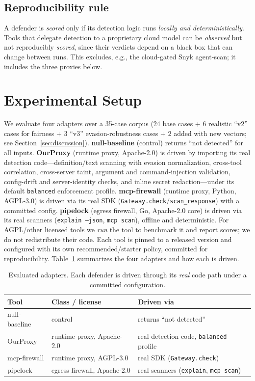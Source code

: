\documentclass[sigconf,review,anonymous]{acmart}
\begin{document}
\subsection{Reproducibility rule}\label{sec:repro}
A defender is \emph{scored} only if its detection logic runs \emph{locally and deterministically}. Tools that delegate detection to a proprietary cloud model can be \emph{observed} but not reproducibly \emph{scored}, since their verdicts depend on a black box that can change between runs. This excludes, e.g., the cloud-gated Snyk agent-scan; it includes the three proxies below.

\section{Experimental Setup}\label{sec:setup}
We evaluate four adapters over a 35-case corpus (24 base cases + 6 realistic ``v2'' cases for fairness + 3 ``v3'' evasion-robustness cases + 2 added with new vectors; see Section~\ref{sec:discussion}). \textbf{null-baseline} (control) returns ``not detected'' for all inputs. \textbf{OurProxy} (runtime proxy, Apache-2.0) is driven by importing its real detection code---definition/text scanning with evasion normalization, cross-tool correlation, cross-server taint, argument and command-injection validation, config-drift and server-identity checks, and inline secret redaction---under its default \texttt{balanced} enforcement profile. \textbf{mcp-firewall} (runtime proxy, Python, AGPL-3.0) is driven via its real SDK (\texttt{Gateway.check}/\texttt{scan\_response}) with a committed config. \textbf{pipelock} (egress firewall, Go, Apache-2.0 core) is driven via its real scanners (\texttt{explain --json}, \texttt{mcp scan}), offline and deterministic. For AGPL/other licensed tools we \emph{run} the tool to benchmark it and report scores; we do not redistribute their code. Each tool is pinned to a released version and configured with its own recommended/starter policy, committed for reproducibility. Table~\ref{tab:setup} summarizes the four adapters and how each is driven.

\begin{table}[t]
\caption{Evaluated adapters. Each defender is driven through its \emph{real} code path under a committed configuration.}
\label{tab:setup}
\small
\setlength{\tabcolsep}{4pt}
\begin{tabular}{@{}l p{2.5cm} p{2.7cm}@{}}
\toprule
Tool & Class / license & Driven via \\
\midrule
null-baseline & control & returns ``not detected'' \\
OurProxy & runtime proxy, Apache-2.0 & real detection code, \texttt{balanced} profile \\
mcp-firewall & runtime proxy, AGPL-3.0 & real SDK (\texttt{Gateway.check}) \\
pipelock & egress firewall, Apache-2.0 & real scanners (\texttt{explain}, \texttt{mcp scan}) \\
\bottomrule
\end{tabular}
\end{table}
\end{document}
